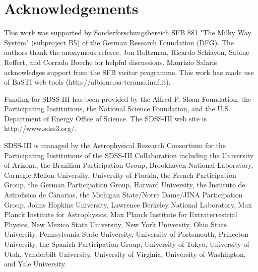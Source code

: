 \documentclass[a4paper,fleqn,usenatbib]{mnras}
\begin{document}
\section*{Acknowledgements}

This work was supported by Sonderforschungsbereich SFB 881 "The Milky Way System" (subproject B5) of the German Research Foundation (DFG). The authors thank the anonymous referee, Jon Holtzman, Ricardo Schiavon, Sabine Reffert, and Corrado Boeche for helpful discussions. Maurizio Salaris acknowledges support from the SFB visitor programme. This work has made use of BaSTI web tools (http://albione.oa-teramo.inaf.it).

Funding for SDSS-III has been provided by the Alfred P. Sloan Foundation, the Participating Institutions, the National Science Foundation, and the U.S. Department of Energy Office of Science. The SDSS-III web site is http://www.sdss3.org/.

SDSS-III is managed by the Astrophysical Research Consortium for the Participating Institutions of the SDSS-III Collaboration including the University of Arizona, the Brazilian Participation Group, Brookhaven National Laboratory, Carnegie Mellon University, University of Florida, the French Participation Group, the German Participation Group, Harvard University, the Instituto de Astrofisica de Canarias, the Michigan State/Notre Dame/JINA Participation Group, Johns Hopkins University, Lawrence Berkeley National Laboratory, Max Planck Institute for Astrophysics, Max Planck Institute for Extraterrestrial Physics, New Mexico State University, New York University, Ohio State University, Pennsylvania State University, University of Portsmouth, Princeton University, the Spanish Participation Group, University of Tokyo, University of Utah, Vanderbilt University, University of Virginia, University of Washington, and Yale University.







\end{document}
